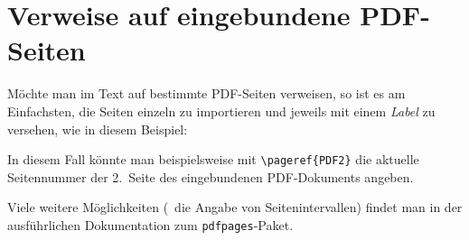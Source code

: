 \section{Verweise auf eingebundene PDF-Seiten}

Möchte man im Text auf bestimmte PDF-Seiten verweisen, so ist es am
Einfachsten, die Seiten einzeln zu importieren und jeweils mit einem
\emph{Label} zu versehen, wie in diesem Beispiel:
%
\begin{LaTeXCode}[numbers=none]


\end{LaTeXCode}
%
In diesem Fall könnte man beispielsweise mit \verb!\pageref{PDF2}! die
aktuelle Seitennummer der 2.\ Seite des eingebundenen PDF-Dokuments angeben.

Viele weitere Möglichkeiten (\zB\ die Angabe von Seitenintervallen) findet man
in der ausführlichen Dokumentation zum \texttt{pdfpages}-Paket.





